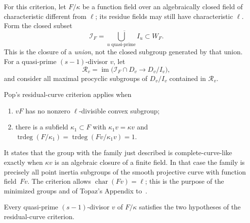 For this criterion, let $F/\kappa$ be a function field over an
algebraically closed field of characteristic different from $\ell$;
its residue fields may still have characteristic $\ell$.
Form the closed subset
\[
 \mathscr I_F=
 \overline{\bigcup_{u\text{ quasi-prime}} I_u}\subset W_F.
\]
This is the closure of a \emph{union}, not the closed subgroup
generated by that union.  For a quasi-prime $(s-1)$-divisor $v$, let
\begin{equation}\label{local:residual-set}
 \mathscr R_v=
 \operatorname{im}\bigl(\mathscr I_F\cap D_v\longrightarrow
 D_v/I_v\bigr),
\end{equation}
and consider all maximal procyclic subgroups of $D_v/I_v$
contained in $\mathscr R_v$.

Pop's residual-curve criterion
\cite[Section~4, Theorem~4.2(i)(a)]{PopMin2015} applies when
\begin{enumerate}
 \item $vF$ has no nonzero $\ell$-divisible convex subgroup;
 \item there is a subfield $\kappa_1\subset F$ with
 $\kappa_1v=\kappa v$ and
 $\operatorname{trdeg}(F/\kappa_1)
 =\operatorname{trdeg}(Fv/\kappa_1v)=1$.
\end{enumerate}
It states that the group with the family just described is
complete-curve-like exactly when $\kappa v$ is an algebraic closure
of a finite field.  In that case the family is precisely all point
inertia subgroups of the smooth projective curve with function
field~$Fv$.  The criterion allows $\operatorname{char}(Fv)=\ell$;
this is the purpose of the minimized groups and of Topaz's Appendix
to~\cite{PopMin2015}.

\begin{lemma}\label{local:criterion-hypotheses}
Every quasi-prime $(s-1)$-divisor $v$ of $F/\kappa$ satisfies the two
hypotheses of the residual-curve criterion.
\end{lemma}

